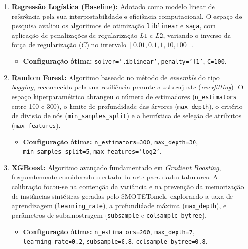 \documentclass[12pt,a4paper]{article}
\begin{document}
\begin{enumerate}
    \item \textbf{Regressão Logística (Baseline):} Adotado como modelo linear de referência pela sua interpretabilidade e eficiência computacional. O espaço de pesquisa avaliou os algoritmos de otimização \texttt{liblinear} e \texttt{saga}, com aplicação de penalizações de regularização $L1$ e $L2$, variando o inverso da força de regularização ($C$) no intervalo $[0.01, 0.1, 1, 10, 100]$.
    \begin{itemize}
        \item \textbf{Configuração ótima:} \texttt{solver='liblinear'}, \texttt{penalty='l1'}, \texttt{C=100}.
    \end{itemize}

    \item \textbf{Random Forest:} Algoritmo baseado no método de \textit{ensemble} do tipo \textit{bagging}, reconhecido pela sua resiliência perante o sobreajuste (\textit{overfitting}). O espaço hiperparamétrico abrangeu o número de estimadores (\texttt{n\_estimators} entre 100 e 300), o limite de profundidade das árvores (\texttt{max\_depth}), o critério de divisão de nós (\texttt{min\_samples\_split}) e a heurística de seleção de atributos (\texttt{max\_features}).
    \begin{itemize}
        \item \textbf{Configuração ótima:} \texttt{n\_estimators=300}, \texttt{max\_depth=30}, \texttt{min\_samples\_split=5}, \texttt{max\_features='log2'}.
    \end{itemize}

    \item \textbf{XGBoost:} Algoritmo avançado fundamentado em \textit{Gradient Boosting}, frequentemente considerado o estado da arte para dados tabulares. A calibração focou-se na contenção da variância e na prevenção da memorização de instâncias sintéticas geradas pelo SMOTETomek, explorando a taxa de aprendizagem (\texttt{learning\_rate}), a profundidade máxima (\texttt{max\_depth}), e parâmetros de subamostragem (\texttt{subsample} e \texttt{colsample\_bytree}).
    \begin{itemize}
        \item \textbf{Configuração ótima:} \texttt{n\_estimators=200}, \texttt{max\_depth=7}, \texttt{learning\_rate=0.2}, \texttt{subsample=0.8}, \texttt{colsample\_bytree=0.8}.
    \end{itemize}
\end{enumerate}
\end{document}
